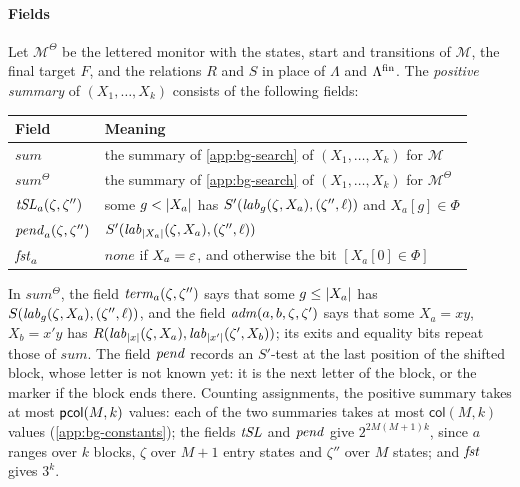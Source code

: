 \paragraph{Fields}
Let $\mathcal M^\Theta$ be the lettered monitor with the states, start and
transitions of $\mathcal M$, the final target $F$, and the relations $R$ and $S$
in place of $\Lambda$ and $\Lambda^{\mathrm{fin}}$. The \emph{positive summary} of
$(X_1,\ldots,X_k)$ consists of the following fields:
\begin{center}
\small
\begin{tabular}{@{}lp{.7\linewidth}@{}}
\toprule
Field & Meaning\\
\midrule
$\mathit{sum}$ & the summary of \cref{app:bg-search} of $(X_1,\ldots,X_k)$ for $\mathcal M$\\
$\mathit{sum}^\Theta$ & the summary of \cref{app:bg-search} of $(X_1,\ldots,X_k)$ for $\mathcal M^\Theta$\\
$\mathit{tSL}_a(\zeta,\zeta'')$ & some $g<\lvert X_a\rvert$ has
  $S'(\mathit{lab}_g(\zeta,X_a),(\zeta'',\ell))$ and $X_a[g]\in\Phi$\\
$\mathit{pend}_a(\zeta,\zeta'')$ & $S'(\mathit{lab}_{\lvert X_a\rvert}(\zeta,X_a),(\zeta'',\ell))$\\
$\mathit{fst}_a$ & $\mathit{none}$ if $X_a=\varepsilon$, and otherwise the bit $[X_a[0]\in\Phi]$\\
\bottomrule
\end{tabular}
\end{center}
In $\mathit{sum}^\Theta$, the field $\mathit{term}_a(\zeta,\zeta'')$ says that some
$g\le\lvert X_a\rvert$ has $S(\mathit{lab}_g(\zeta,X_a),(\zeta'',\ell))$, and the field
$\mathit{adm}(a,b,\zeta,\zeta')$ says that some $X_a=xy$, $X_b=x'y$ has
$R(\mathit{lab}_{\lvert x\rvert}(\zeta,X_a),\mathit{lab}_{\lvert x'\rvert}(\zeta',X_b))$; its exits and
equality bits repeat those of $\mathit{sum}$. The field $\mathit{pend}$ records an
$S'$-test at the last position of the shifted block, whose letter is not known
yet: it is the next letter of the block, or the marker if the block ends there.
Counting assignments, the positive summary takes at most $\mathsf{pcol}(M,k)$ values:
each of the two summaries takes at most $\mathsf{col}(M,k)$ values
(\cref{app:bg-constants}); the fields $\mathit{tSL}$ and $\mathit{pend}$ give
$2^{2M(M+1)k}$, since $a$ ranges over $k$ blocks, $\zeta$ over $M+1$ entry
states and $\zeta''$ over $M$ states; and $\mathit{fst}$ gives $3^k$.

